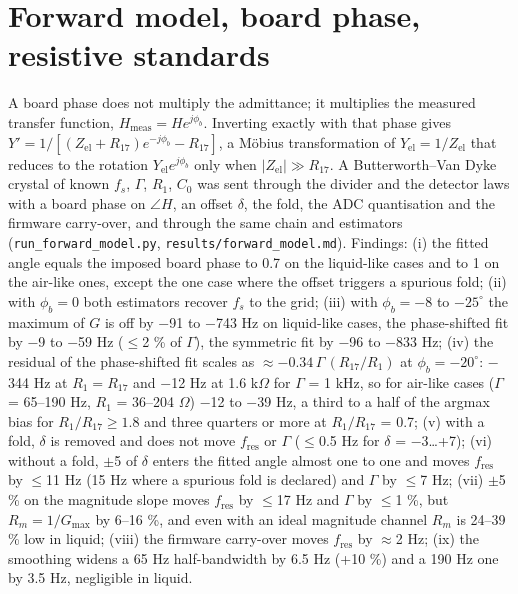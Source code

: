 \documentclass[11pt,a4paper]{article}
\begin{document}
\section{Forward model, board phase, resistive standards}

A board phase does not multiply the admittance; it multiplies the measured transfer function, $H_\mathrm{meas} = He^{j\phi_b}$. Inverting exactly with that phase gives $Y' = 1/[(Z_\mathrm{el} + R_{17})e^{-j\phi_b} - R_{17}]$, a Möbius transformation of $Y_\mathrm{el} = 1/Z_\mathrm{el}$ that reduces to the rotation $Y_\mathrm{el}e^{j\phi_b}$ only when $|Z_\mathrm{el}| \gg R_{17}$. A Butterworth--Van Dyke crystal of known $f_s$, $\Gamma$, $R_1$, $C_0$ was sent through the divider and the detector laws with a board phase on $\angle H$, an offset $\delta$, the fold, the ADC quantisation and the firmware carry-over, and through the same chain and estimators (\texttt{run\_forward\_model.py}, \texttt{results/forward\_model.md}). Findings: (i) the fitted angle equals the imposed board phase to 0.7\textdegree{} on the liquid-like cases and to 1\textdegree{} on the air-like ones, except the one case where the offset triggers a spurious fold; (ii) with $\phi_b = 0$ both estimators recover $f_s$ to the grid; (iii) with $\phi_b = -8$ to $-25^\circ$ the maximum of $G$ is off by $-$91 to $-$743 Hz on liquid-like cases, the phase-shifted fit by $-$9 to $-$59 Hz ($\le$2 \% of $\Gamma$), the symmetric fit by $-$96 to $-$833 Hz; (iv) the residual of the phase-shifted fit scales as $\approx -0.34\,\Gamma\,(R_{17}/R_1)$ at $\phi_b = -20^\circ$: $-$344 Hz at $R_1 = R_{17}$ and $-$12 Hz at 1.6 k$\Omega$ for $\Gamma$ = 1 kHz, so for air-like cases ($\Gamma$ = 65--190 Hz, $R_1$ = 36--204 $\Omega$) $-$12 to $-$39 Hz, a third to a half of the argmax bias for $R_1/R_{17} \ge 1.8$ and three quarters or more at $R_1/R_{17}$ = 0.7; (v) with a fold, $\delta$ is removed and does not move $f_\mathrm{res}$ or $\Gamma$ ($\le$0.5 Hz for $\delta$ = $-$3\ldots{}+7\textdegree{}); (vi) without a fold, $\pm$5\textdegree{} of $\delta$ enters the fitted angle almost one to one and moves $f_\mathrm{res}$ by $\le$11 Hz (15 Hz where a spurious fold is declared) and $\Gamma$ by $\le$7 Hz; (vii) $\pm$5 \% on the magnitude slope moves $f_\mathrm{res}$ by $\le$17 Hz and $\Gamma$ by $\le$1 \%, but $R_m = 1/G_\mathrm{max}$ by 6--16 \%, and even with an ideal magnitude channel $R_m$ is 24--39 \% low in liquid; (viii) the firmware carry-over moves $f_\mathrm{res}$ by $\approx$2 Hz; (ix) the smoothing widens a 65 Hz half-bandwidth by 6.5 Hz (+10 \%) and a 190 Hz one by 3.5 Hz, negligible in liquid.
\end{document}
